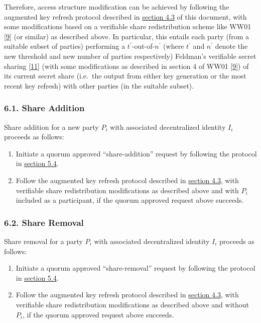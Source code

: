 \documentclass[
]{article}
\providecommand{\tightlist}{%
  \setlength{\itemsep}{0pt}\setlength{\parskip}{0pt}}
\begin{document}
Therefore, access structure modification can be achieved by following
the augmented key refresh protocol described in
\protect\hyperlink{key-refresh}{section 4.3} of this document, with some
modifications based on a verifiable share redistribution scheme like
WW01 {[}\protect\hyperlink{ref-ww01}{9}{]} (or similar) as described
above. In particular, this entails each party (from a suitable subset of
parties) performing a \(t ^\prime\)-out-of-\(n ^\prime\) (where
\(t ^\prime\) and \(n ^\prime\) denote the new threshold and new number
of parties respectively) Feldman's verifiable secret sharing
{[}\protect\hyperlink{ref-feldman-vss}{11}{]} (with some modifications
as described in section 4 of WW01 {[}\protect\hyperlink{ref-ww01}{9}{]})
of its current secret share (i.e.~the output from either key generation
or the most recent key refresh) with other parties (in the suitable
subset).

\hypertarget{share-addition}{%
\subsubsection{6.1. Share Addition}\label{share-addition}}

Share addition for a new party \(P_i\) with associated decentralized
identity \(I_i\) proceeds as follows:

\begin{enumerate}
\def\labelenumi{\arabic{enumi}.}
\tightlist
\item
  Initiate a quorum approved ``share-addition'' request by following the
  protocol in \protect\hyperlink{quorum-approved-request}{section 5.4}.
\item
  Follow the augmented key refresh protocol described in
  \protect\hyperlink{key-refresh}{section 4.3}, with verifiable share
  redistribution modifications as described above and with \(P_i\)
  included as a participant, if the quorum approved request above
  succeeds.
\end{enumerate}

\hypertarget{share-removal}{%
\subsubsection{6.2. Share Removal}\label{share-removal}}

Share removal for a party \(P_i\) with associated decentralized identity
\(I_i\) proceeds as follows:

\begin{enumerate}
\def\labelenumi{\arabic{enumi}.}
\tightlist
\item
  Initiate a quorum approved ``share-removal'' request by following the
  protocol in \protect\hyperlink{quorum-approved-request}{section 5.4}.
\item
  Follow the augmented key refresh protocol described in
  \protect\hyperlink{key-refresh}{section 4.3}, with verifiable share
  redistribution modifications as described above and without \(P_i\),
  if the quorum approved request above succeeds.
\end{enumerate}
\end{document}
